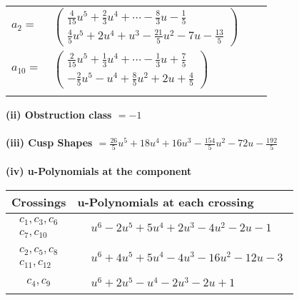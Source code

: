 \documentclass[1p]{elsarticle_modified}
\theoremstyle{definition}
\begin{document}
\begin{tabular}{m{7pt} m{180pt} m{7pt} m{180pt} }
\flushright $a_{2}=$&$\begin{pmatrix}\frac{4}{15} u^5+\frac{2}{3} u^4+\cdots-\frac{8}{3} u-\frac{1}{5}\\\frac{4}{5} u^5+2 u^4+u^3-\frac{21}{5} u^2-7 u-\frac{13}{5}\end{pmatrix}$ \\
\flushright $a_{10}=$&$\begin{pmatrix}\frac{2}{15} u^5+\frac{1}{3} u^4+\cdots-\frac{1}{3} u+\frac{7}{5}\\-\frac{2}{5} u^5- u^4+\frac{8}{5} u^2+2 u+\frac{4}{5}\end{pmatrix}$\\&\end{tabular}
\flushleft \textbf{(ii) Obstruction class $= -1$}\\~\\
\flushleft \textbf{(iii) Cusp Shapes $= \frac{26}{5} u^5+18 u^4+16 u^3-\frac{154}{5} u^2-72 u-\frac{192}{5}$}\\~\\
\newpage\renewcommand{\arraystretch}{1}
\flushleft \textbf{(iv) u-Polynomials at the component}\newline \\
\begin{tabular}{m{50pt}|m{274pt}}
Crossings & \hspace{64pt}u-Polynomials at each crossing \\
\hline $$\begin{aligned}c_{1},c_{3},c_{6}\\c_{7},c_{10}\end{aligned}$$&$\begin{aligned}
&u^6-2 u^5+5 u^4+2 u^3-4 u^2-2 u-1
\end{aligned}$\\
\hline $$\begin{aligned}c_{2},c_{5},c_{8}\\c_{11},c_{12}\end{aligned}$$&$\begin{aligned}
&u^6+4 u^5+5 u^4-4 u^3-16 u^2-12 u-3
\end{aligned}$\\
\hline $$\begin{aligned}c_{4},c_{9}\end{aligned}$$&$\begin{aligned}
&u^6+2 u^5- u^4-2 u^3-2 u+1
\end{aligned}$\\
\hline
\end{tabular}\\~\\
\end{document}
